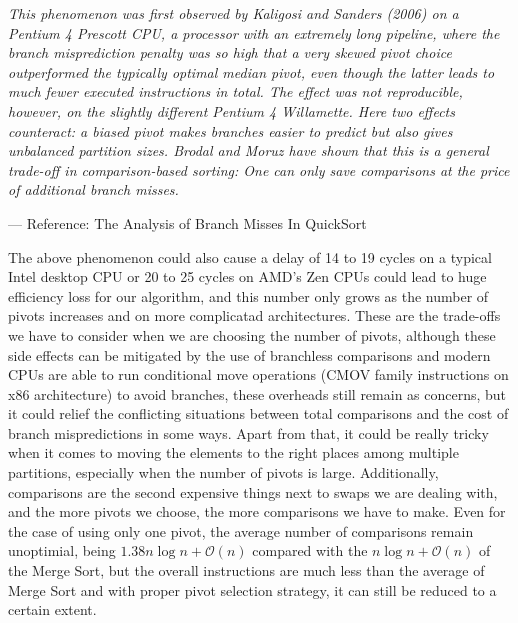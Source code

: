 \documentclass[a4paper,oneside,12pt]{book}
\newcommand{\bigO}{\mathcal{O}}
\begin{document}
\vspace{1em}
\hypertarget{ref:BranchMisses}{}
\textit{This phenomenon was first observed by Kaligosi and Sanders (2006) on a Pentium 4 Prescott CPU, a processor with an extremely long pipeline, where the branch misprediction penalty was so high that a very skewed pivot choice outperformed the typically optimal median pivot, even though the latter leads to much fewer executed instructions in total.
The effect was not reproducible, however, on the slightly different Pentium 4 Willamette. Here two effects counteract: a biased pivot makes branches easier to predict but also gives unbalanced partition sizes. Brodal and Moruz have shown that this is a general trade-off in comparison-based sorting: One can only save comparisons at the price of additional branch misses.}

--- Reference: The Analysis of Branch Misses In QuickSort \cite{AnalysisOfBranchMissesInQuickSort}
\vspace{1em}

The above phenomenon could also cause a delay of 14 to 19 cycles on a typical Intel desktop CPU or 20 to 25 cycles on AMD's Zen CPUs could lead to huge efficiency loss for our algorithm,
and this number only grows as the number of pivots increases and on more complicatad architectures. These are the trade-offs we have to consider when we are choosing the number of pivots,
although these side effects can be mitigated by the use of branchless comparisons and modern CPUs are able to run conditional move operations (CMOV family instructions on x86 architecture) to avoid branches,
these overheads still remain as concerns, but it could relief the conflicting situations between total comparisons and the cost of branch mispredictions in some ways.
Apart from that, it could be really tricky when it comes to moving the elements to the right places among multiple partitions, especially when the number of pivots is large.
Additionally, comparisons are the second expensive things next to swaps we are dealing with, and the more pivots we choose, the more comparisons we have to make.
Even for the case of using only one pivot, the average number of comparisons remain unoptimial, being $1.38n\log n + \bigO(n)$ compared with the $n\log n + \bigO(n)$ of the Merge Sort,
but the overall instructions are much less than the average of Merge Sort and with proper pivot selection strategy, it can still be reduced to a certain extent.

\end{document}
